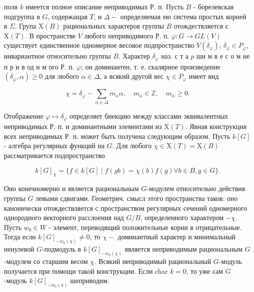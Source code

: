 \documentclass[10pt]{article}
\begin{document}
поля $k$ имеется полное описание неприводимых Р. п. Пусть $B$ - борелевская подгруппа в $G$, содержащая $T$, и $\Delta-$ определяемая ею система простых корней в $\Sigma$. Група $\mathrm{X}(B)$ рациональных характеров группы $B$ отождествляется с $\mathrm{X}(T)$. В пространстве $V$ любого неприводимого Р. п. $\varphi: G \rightarrow G L(V)$ существует единственное одномерное весовое подпространство $V\left(\delta_{\varphi}\right)$, $\delta_{\varphi} \in P_{\varphi}$, инвариантное относительно группы $B$. Характер $\delta_{\varphi}$ наз. с т а $p$ ши м в е с о м не п р и в од и м ого Р. п. $\varphi$; он доминантен, т. е. скалярное произведение $\left(\delta_{\varphi}, \alpha\right) \geqslant 0$ для любого $\alpha \in \Delta$, а всякий другой вес $\chi \in P_{\varphi}$ имеет вид



\[

\chi=\delta_{\varphi}-\sum_{\alpha \in \Delta} m_{\alpha} \alpha, \quad m_{\alpha} \in \mathbb{Z}, \quad m_{\alpha} \geqslant 0 .

\]



Отображение $\varphi \mapsto \delta_{\varphi}$ определяет биекцию между классами эквивалентных неприводимых Р. п. и доминантными элементами из $\mathrm{X}(T)$. Явная конструкция всех неприводимых Р. п. может быть получена следующим образом. Пусть $k[G]$ - алгебра регулярных функций на $G$. Для любого $\chi \in \mathrm{X}(T)=\mathrm{X}(B)$ рассматривается подпространство



\[

k[G]_{\chi}=\{f \in k[G] \mid f(g b)=\chi(b) f(g) \forall b \in B, g \in G\} .

\]



Оно конечномерно и является рациональным $G$-модулем относительно действия группы $G$ левыми сдвигами. Геометрич. смысл этого пространства таков: оно канонически отождествляется с пространством регулярных сечений одномерного однородного векторного расслоения над $G / B$, определенного характером $-\chi$. Пусть $w_{0} \in W$ - элемент, переводящий положительные корни в отрицательные. Тогда если $k[G]_{-w_{0}(\chi)} \neq 0$, то $\chi-$ доминантный характер и минимальный ненулевой $G$-подмодуль в $k[G]_{-w_{0}(\chi)}$ является неприводимым рациональным $G$-модулем со старшим весом $\chi$. Всякий неприводимый рациональный $G$-модуль получается при помощи такой конструкции. Если char $k=0$, то уже сам $G$-модуль $k[G]_{-w_{0}(\mathrm{x})}$ шеприводим.
\end{document}
